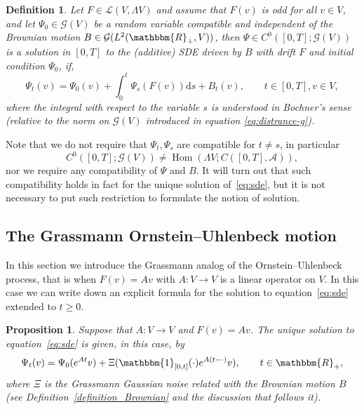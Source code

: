 \documentclass[11pt]{article}
\newcommand{\mathd}{\mathrm{d}}
\newcommand{\tmop}[1]{\ensuremath{\operatorname{#1}}}
\newtheorem{definition}{Definition}
\newtheorem{proposition}{Proposition}
{\theorembodyfont{\rmfamily}\newtheorem{remark}{Remark}}
\begin{document}
\begin{definition}
  Let $F \in \mathcal{L} (V, \Lambda V)$ and assume that $F (v)$ is odd for
  all $v \in V$, and let $\Psi_0 \in \mathcal{G} (V)$ be a random variable
  compatible and independent of the Brownian motion $B \in \mathcal{G} (L^2
  (\mathbbm{R}_+, V))$, then $\Psi \in C^0 ([0, T] ; \mathcal{G} (V))$ is a
  solution in $[0, T]$ to the (additive) SDE driven by $B$ with drift $F$ and
  initial condition $\Psi_0$, if,
  \begin{equation}
    \Psi_t (v) = \Psi_0 (v) + \int_0^t \Psi_s (F (v)) \mathd s + B_t (v),
    \qquad t \in [0, T], v \in V, \label{eq:sde}
  \end{equation}
  where the integral with respect to the variable $s$ is understood in
  Bochner's sense (relative to the norm on $\mathcal{G} (V)$ introduced in
  equation {\eqref{eq:distrance-g}}).
\end{definition}

\begin{remark}
  Note that we do not require that $\Psi_t, \Psi_s$ are compatible for $t \neq
  s$, in particular
  \[ C^0 ([0, T] ; \mathcal{G} (V)) \neq \tmop{Hom} (\Lambda V ; C ([0, T],
     \mathcal{A})), \]
  nor we require any compatibility of $\Psi$ and $B$. It will turn out that
  such compatibility holds in fact for the unique solution
  of~{\eqref{eq:sde}}, but it is not necessary to put such restriction to
  formulate the notion of solution.
\end{remark}

\subsection{The Grassmann Ornstein--Uhlenbeck motion}\label{sec:ou}

In this section we introduce the Grassmann analog of the Ornstein--Uhlenbeck
process, that is when $F (v) = A v$ with $A : V \rightarrow V$ is a linear
operator on $V$. In this case we can write down an explicit formula for the
solution to equation~{\eqref{eq:sde}} extended to $t \geqslant 0$.

\begin{proposition}
  \label{proposition_linear}Suppose that $A : V \rightarrow V$ and $F (v) = A
  v$. The unique solution to equation~{\eqref{eq:sde}} is given, in this case,
  by
  \begin{equation}
    \Psi_t (v) = \Psi_0 (e^{A t} v) + \Xi (\mathbbm{1}_{[0, t]} (\cdot) e^{A (t
    - \cdot)} v), \qquad t \in \mathbbm{R}_+, \label{eq:linear}
  \end{equation}
  where $\Xi$ is the Grassmann Gaussian noise related with the Brownian motion
  $B$ (see Definition~\ref{definition_Brownian} and the discussion that
  follows it).
\end{proposition}
\end{document}
